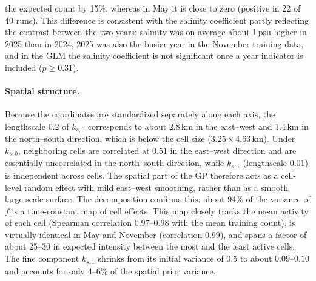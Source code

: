 the expected count by 15\%, whereas in May it is close to zero (positive in 22 of 40 runs). This difference is consistent with the salinity coefficient partly reflecting the contrast between the two years: salinity was on average about 1\,psu higher in 2025 than in 2024, 2025 was also the busier year in the November training data, and in the GLM the salinity coefficient is not significant once a year indicator is included ($p\ge0.31$).

\paragraph{Spatial structure.}
Because the coordinates are standardized separately along each axis, the lengthscale $0.2$ of $k_{s,0}$ corresponds to about $2.8$\,km in the east--west and $1.4$\,km in the north--south direction, which is below the cell size ($3.25 \times 4.63$\,km). Under $k_{s,0}$, neighboring cells are correlated at $0.51$ in the east--west direction and are essentially uncorrelated in the north--south direction, while $k_{s,1}$ (lengthscale $0.01$) is independent across cells. The spatial part of the GP therefore acts as a cell-level random effect with mild east--west smoothing, rather than as a smooth large-scale surface. The decomposition confirms this: about 94\% of the variance of $\bar f$ is a time-constant map of cell effects. This map closely tracks the mean activity of each cell (Spearman correlation $0.97$--$0.98$ with the mean training count), is virtually identical in May and November (correlation $0.99$), and spans a factor of about 25--30 in expected intensity between the most and the least active cells. The fine component $k_{s,1}$ shrinks from its initial variance of $0.5$ to about $0.09$--$0.10$ and accounts for only 4--6\% of the spatial prior variance.

